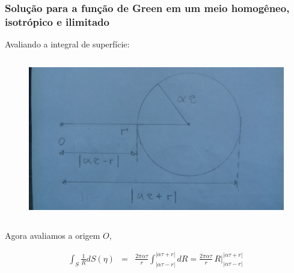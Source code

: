 \documentclass{beamer}
\begin{document}
\begin{frame}
	\frametitle{\textbf{Solu\c{c}\~ao para a fun\c{c}\~ao de Green em um meio homog\^eneo, isotr\'opico e ilimitado}}
	\begin{flushleft}
		\textcolor{red!60!black}{Avaliando a integral de superf\'icie:}
	\end{flushleft}
	\begin{columns}        
		\begin{column}{0.60\textwidth}    
			\begin{figure}[h!]   
				\includegraphics[scale=0.06]{Fig6}       
			\end{figure}
		\end{column}
	\end{columns}
	
	\begin{flushleft}
		Agora avaliamos a origem $O$, 
	\end{flushleft}
	\begin{eqnarray}
	\label{ten1}
	\int_{S} \frac{1}{R} dS(\eta)  &=& \frac{2\pi \alpha \tau}{r} \int_{\left| \alpha\tau -r \right|}^{\left| \alpha\tau +r \right|}  dR  = \frac{2\pi \alpha \tau}{r}\, R \Big|_{\left| \alpha\tau -r \right|}^{\left| \alpha\tau +r \right|} \, 
	\end{eqnarray}
	
\end{frame}%
\end{document}

